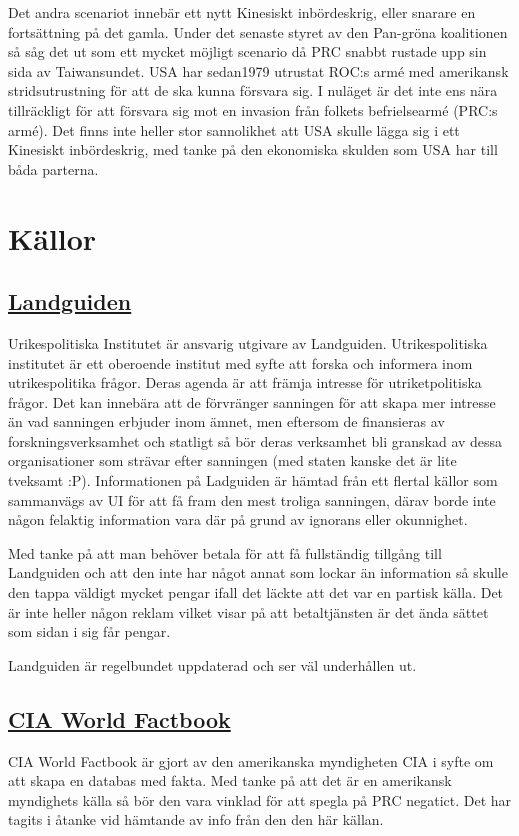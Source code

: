 \documentclass[a4paper,10pt]{article}
\begin{document}
Det andra scenariot innebär ett nytt Kinesiskt inbördeskrig, eller snarare en fortsättning på det gamla. Under det senaste styret av den Pan-gröna koalitionen så såg det ut som ett mycket möjligt scenario då PRC snabbt rustade upp sin sida av Taiwansundet. USA har sedan1979 utrustat ROC:s armé med amerikansk stridsutrustning för att de ska kunna försvara sig. I nuläget är det inte ens nära tillräckligt för att försvara sig mot en invasion från folkets befrielsearmé (PRC:s armé). Det finns inte heller stor sannolikhet att USA skulle lägga sig i ett Kinesiskt inbördeskrig, med tanke på den ekonomiska skulden som USA har till båda parterna.

\section*{Källor}
\subsection*{\href{https://www.landguiden.se/Lander/Asien/Taiwan}{Landguiden}}
Urikespolitiska Institutet är ansvarig utgivare av Landguiden. Utrikespolitiska institutet är ett oberoende institut med syfte att forska och informera inom utrikespolitika frågor. Deras agenda är att främja intresse för utriketpolitiska frågor. Det kan innebära att de förvränger sanningen för att skapa mer intresse än vad sanningen erbjuder inom ämnet, men eftersom de finansieras av forskningsverksamhet och statligt så bör deras verksamhet bli granskad av dessa organisationer som strävar efter sanningen (med staten kanske det är lite tveksamt :P). Informationen på Ladguiden är hämtad från ett flertal källor som sammanvägs av UI för att få fram den mest troliga sanningen, därav borde inte någon felaktig information vara där på grund av ignorans eller okunnighet. 

Med tanke på att man behöver betala för att få fullständig tillgång till Landguiden och att den inte har något annat som lockar än information så skulle den tappa väldigt mycket pengar ifall det läckte att det var en partisk källa. Det är inte heller någon reklam vilket visar på att betaltjänsten är det ända sättet som sidan i sig får pengar.

Landguiden är regelbundet uppdaterad och ser väl underhållen ut.
\subsection*{\href{https://www.cia.gov/library/publications/the-world-factbook/geos/tw.html}{CIA World Factbook}}
CIA World Factbook är gjort av den amerikanska myndigheten CIA i syfte om att skapa en databas med fakta. Med tanke på att det är en amerikansk myndighets källa så bör den vara vinklad för att spegla på PRC negatict. Det har tagits i åtanke vid hämtande av info från den den här källan.
\end{document}
